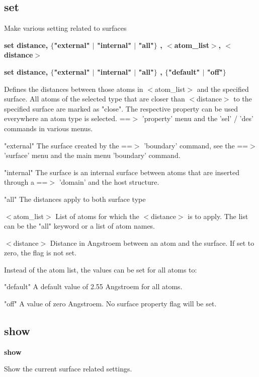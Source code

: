 \subsection*{set}
\par
Make various setting related to surfaces 
\par
{\bf set distance, $ \{$"external" $| $ "internal" $| $ "all"$\} $ , $ <$atom\_list$> $, $ <$distance$> $ \par }
{\bf set distance, $ \{$"external" $| $ "internal" $| $ "all"$\} $ , $ \{$"default" $| $ "off"$\} $ \par }
\par
\vspace{3pt}
Defines the distances between those atoms in $ <$atom\_list$> $ and the 
specified surface. All atoms of the selected type that are closer 
than $ <$distance$> $ to the specified surface are marked as "close". The 
respective property can be used everywhere an atom type is selected. 
==$> $ 'property' menu and the 'sel' / 'des' commands in various menus. 
\par
"external" 
The surface created by the ==$> $ 'boundary' command, see the 
==$> $ 'surface' menu and the main menu 'boundary' command. 
\par
"internal" 
The surface is an internal surface between atoms that are inserted 
through a ==$> $ 'domain' and the host structure. 
\par
"all" 
The distances apply to both surface type 
\par
$ <$atom\_list$> $ 
List of atoms for which the $ <$distance$> $ is to apply. The list can be 
the "all" keyword or a list of atom names. 
\par
$ <$distance$> $ 
Distance in Angstroem between an atom and the surface. If set to 
zero, the flag is not set. 
\par
Instead of the atom list, the values can be set for all atoms to: 
\par
"default" 
A default value of 2.55 Angstroem for all atoms. 
\par
"off" 
A value of zero Angstroem. No surface property flag will be set. 
\subsection*{show}
{\bf show \par }
\par
\vspace{3pt}
Show the current surface related settings. 
